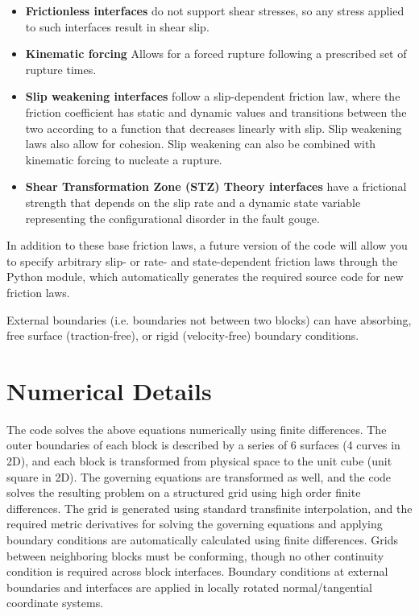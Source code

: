 \documentclass[12pt]{article}   	%
\begin{document}
\begin{itemize}
\item {\bf Frictionless interfaces} do not support shear stresses, so any stress applied to such interfaces result in shear slip.
\item {\bf Kinematic forcing} Allows for a forced rupture following a prescribed set of rupture times.
\item {\bf Slip weakening interfaces} follow a slip-dependent friction law, where the friction coefficient has static and dynamic values and transitions between the two according to a function that decreases linearly with slip. Slip weakening laws also allow for cohesion. Slip weakening can also be combined with kinematic forcing to nucleate a rupture.
\item {\bf Shear Transformation Zone (STZ) Theory interfaces} have a frictional strength that depends on the slip rate and a dynamic state variable representing the configurational disorder in the fault gouge.
\end{itemize}

In addition to these base friction laws, a future version of the code will allow you to specify arbitrary slip- or rate- and state-dependent friction laws through the Python module, which automatically generates the required source code for new friction laws.

External boundaries (i.e. boundaries not between two blocks) can have absorbing, free surface (traction-free), or rigid (velocity-free) boundary conditions.

\section{Numerical Details}

The code solves the above equations numerically using finite differences. The outer boundaries of each block is described by a series of 6 surfaces (4 curves in 2D), and each block is transformed from physical space to the unit cube (unit square in 2D). The governing equations are transformed as well, and the code solves the resulting problem on a structured grid using high order finite differences. The grid is generated using standard transfinite interpolation, and the required metric derivatives for solving the governing equations and applying boundary conditions are automatically calculated using finite differences. Grids between neighboring blocks must be conforming, though no other continuity condition is required across block interfaces. Boundary conditions at external boundaries and interfaces are applied in locally rotated normal/tangential coordinate systems.
\end{document}
